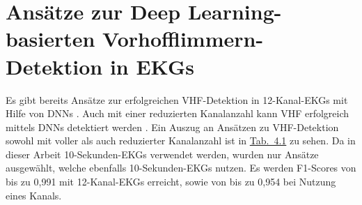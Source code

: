  

\section{Ansätze zur Deep Learning-basierten Vorhofflimmern-Detektion in EKGs}\label{sec:DLEKG}



Es gibt bereits Ansätze zur erfolgreichen \gls{VHF}-Detektion in 12-Kanal-\gls{EKG}s mit Hilfe von \gls{DNN}s \cite{murat_et_al_review_2021}. Auch mit einer reduzierten Kanalanzahl kann \gls{VHF} erfolgreich mittels \gls{DNN}s detektiert werden \cite{murat_et_al_review_2021}. Ein Auszug an Ansätzen zu \gls{VHF}-Detektion sowohl mit voller als auch reduzierter Kanalanzahl ist in \hyperref[tab:DL_AF]{Tab.~4.1} zu sehen. Da in dieser Arbeit 10-Sekunden-\gls{EKG}s verwendet werden, wurden nur Ansätze ausgewählt, welche ebenfalls 10-Sekunden-\gls{EKG}s nutzen. Es werden F1-Scores von bis zu 0,991 mit 12-Kanal-\gls{EKG}s erreicht, sowie von bis zu 0,954 bei Nutzung eines Kanals.

